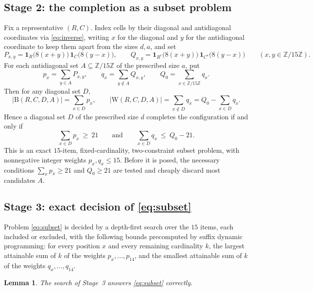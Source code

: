\documentclass[11pt]{amsart}
\newtheorem{lemma}[theorem]{Lemma}
\theoremstyle{remark}
\newcommand{\Z}{\mathbb{Z}}
\newcommand{\Zn}{\Z/15\Z}
\newcommand{\Bl}{\mathrm{B}}
\newcommand{\Wh}{\mathrm{W}}
\begin{document}
\subsection*{Stage 2: the completion as a subset problem}

Fix a representative $(R,C)$. Index cells by their diagonal and antidiagonal coordinates via \eqref{eq:inverse}, writing $x$ for the diagonal and $y$ for the antidiagonal coordinate to keep them apart from the sizes $d,a$, and set
\[
P_{x,y}=\mathbf 1_R\bigl(8(x+y)\bigr)\,\mathbf 1_C\bigl(8(y-x)\bigr),
\qquad
Q_{x,y}=\mathbf 1_{R^{c}}\bigl(8(x+y)\bigr)\,\mathbf 1_{C^{c}}\bigl(8(y-x)\bigr)
\qquad (x,y\in\Zn).
\]
For each antidiagonal set $A\subseteq\Zn$ of the prescribed size $a$, put
\[
p_x=\sum_{y\in A}P_{x,y},
\qquad
q_x=\sum_{y\notin A}Q_{x,y},
\qquad
Q_0=\sum_{x\in\Zn}q_x .
\]
Then for any diagonal set $D$,
\[
|\Bl(R,C,D,A)|=\sum_{x\in D}p_x,
\qquad
|\Wh(R,C,D,A)|=\sum_{x\notin D}q_x=Q_0-\sum_{x\in D}q_x .
\]
Hence a diagonal set $D$ of the prescribed size $d$ completes the configuration if and only if
\begin{equation}\label{eq:subset}
\sum_{x\in D}p_x\ \ge\ 21
\qquad\text{and}\qquad
\sum_{x\in D}q_x\ \le\ Q_0-21 .
\end{equation}
This is an exact $15$-item, fixed-cardinality, two-constraint subset problem, with nonnegative integer weights $p_x,q_x\le 15$. Before it is posed, the necessary conditions $\sum_x p_x\ge 21$ and $Q_0\ge 21$ are tested and cheaply discard most candidates $A$.

\subsection*{Stage 3: exact decision of \eqref{eq:subset}}

Problem \eqref{eq:subset} is decided by a depth-first search over the $15$ items, each included or excluded, with the following bounds precomputed by suffix dynamic programming: for every position $x$ and every remaining cardinality $k$, the largest attainable sum of $k$ of the weights $p_x,\dots,p_{14}$, and the smallest attainable sum of $k$ of the weights $q_x,\dots,q_{14}$.

\begin{lemma}\label{lem:exhaustive}
The search of Stage~3 answers \eqref{eq:subset} correctly.
\end{lemma}
\end{document}
